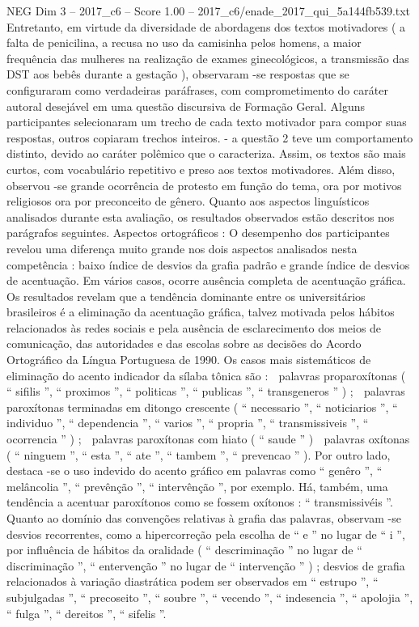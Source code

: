 \begin{textsample}{NEG Dim 3 – 2017\_c6 – Score 1.00 – 2017\_c6/enade\_2017\_qui\_5a144fb539.txt}
Entretanto, em virtude da diversidade de abordagens dos textos motivadores ( a falta de penicilina, a recusa no uso da camisinha pelos homens, a maior frequência das mulheres na realização de exames ginecológicos, a transmissão das DST aos bebês durante a gestação ), observaram -se respostas que se configuraram como verdadeiras paráfrases, com comprometimento do caráter autoral desejável em uma questão discursiva de Formação Geral.
Alguns participantes selecionaram um trecho de cada texto motivador para compor suas respostas, outros copiaram trechos inteiros. - a questão 2 teve um comportamento distinto, devido ao caráter polêmico que o caracteriza.
Assim, os textos são mais curtos, com vocabulário repetitivo e preso aos textos motivadores.
Além disso, observou -se grande ocorrência de protesto em função do tema, ora por motivos religiosos ora por preconceito de gênero.
Quanto aos aspectos linguísticos analisados durante esta avaliação, os resultados observados estão descritos nos parágrafos seguintes.
Aspectos ortográficos : O desempenho dos participantes revelou uma diferença muito grande nos dois aspectos analisados nesta competência : baixo índice de desvios da grafia padrão e grande índice de desvios de acentuação.
Em vários casos, ocorre ausência completa de acentuação gráfica.
Os resultados revelam que a tendência dominante entre os universitários brasileiros é a eliminação da acentuação gráfica, talvez motivada pelos hábitos relacionados às redes sociais e pela ausência de esclarecimento dos meios de comunicação, das autoridades e das escolas sobre as decisões do Acordo Ortográfico da Língua Portuguesa de 1990.
Os casos mais sistemáticos de eliminação do acento indicador da sílaba tônica são :  palavras proparoxítonas ( “ sifilis ”, “ proximos ”, “ politicas ”, “ publicas ”, “ transgeneros ” ) ;  palavras paroxítonas terminadas em ditongo crescente ( “ necessario ”, “ noticiarios ”, “ individuo ”, “ dependencia ”, “ varios ”, “ propria ”, “ transmissiveis ”, “ ocorrencia ” ) ;  palavras paroxítonas com hiato ( “ saude ” )  palavras oxítonas ( “ ninguem ”, “ esta ”, “ ate ”, “ tambem ”, “ prevencao ” ).
Por outro lado, destaca -se o uso indevido do acento gráfico em palavras como “ genêro ”, “ melâncolia ”, “ prevênção ”, “ intervênção ”, por exemplo.
Há, também, uma tendência a acentuar paroxítonos como se fossem oxítonos : “ transmissivéis ”.
Quanto ao domínio das convenções relativas à grafia das palavras, observam -se desvios recorrentes, como a hipercorreção pela escolha de “ e ” no lugar de “ i ”, por influência de hábitos da oralidade ( “ descriminação ” no lugar de “ discriminação ”, “ entervenção ” no lugar de “ intervenção ” ) ; desvios de grafia relacionados à variação diastrática podem ser observados em “ estrupo ”, “ subjulgadas ”, “ precoseito ”, “ soubre ”, “ vecendo ”, “ indesencia ”, “ apolojia ”, “ fulga ”, “ dereitos ”, “ sifelis ”.

\end{textsample}
